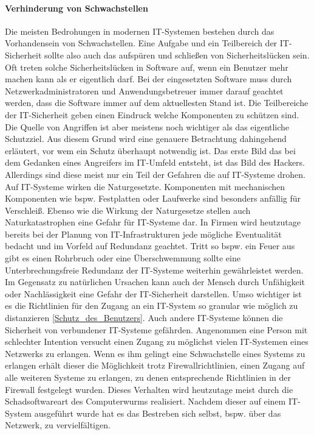 \documentclass[utf8,biblatex]{lni}
\begin{document}
\paragraph{Verhinderung von Schwachstellen}
Die meisten Bedrohungen in modernen IT-Systemen bestehen durch das Vorhandensein von Schwachstellen. Eine Aufgabe und ein Teilbereich der IT-Sicherheit sollte also auch 
das aufspüren und schließen von Sicherheitslücken sein. Oft treten solche Sicherheitslücken in Software auf, wenn ein Benutzer mehr machen kann als er eigentlich darf. 
Bei der eingesetzten Software muss durch Netzwerkadministratoren und Anwendungsbetreuer immer darauf geachtet werden, dass die Software immer auf dem aktuellesten Stand ist. 
\newline
Die Teilbereiche der IT-Sicherheit geben einen Eindruck welche Komponenten zu schützen sind. 
Die Quelle von Angriffen ist aber meistens noch wichtiger als das eigentliche Schutzziel. Aus diesem Grund wird eine genauere Betrachtung dahingehend 
erläutert, vor wem ein Schutz überhaupt notwendig ist. 
\newline
Das erste Bild das bei dem Gedanken eines Angreifers im IT-Umfeld entsteht, ist das Bild des Hackers. Allerdings sind diese meist nur ein Teil der Gefahren die auf IT-Systeme drohen. 
Auf IT-Systeme wirken die Naturgesetzte. Komponenten mit mechanischen Komponenten wie bspw. Festplatten oder Laufwerke sind besonders anfällig für Verschleiß. 
Ebenso wie die Wirkung der Naturgesetze stellen auch Naturkatastrophen eine Gefahr für IT-Systeme dar. In Firmen wird heutzutage bereits bei der Planung von 
IT-Infrastrukturen jede mögliche Eventualität bedacht und im Vorfeld auf Redundanz geachtet. Tritt so bspw. ein Feuer aus gibt es einen Rohrbruch oder eine Überschwemmung sollte 
eine Unterbrechungsfreie Redundanz der IT-Systeme weiterhin gewährleistet werden. 
\newline
Im Gegensatz zu natürlichen Ursachen kann auch der Mensch durch Unfähigkeit oder Nachlässigkeit eine Gefahr der IT-Sicherheit darstellen. 
Umso wichtiger ist es die Richtlinien für den Zugang an ein IT-System so granular wie möglich zu distanzieren \autoref{Schutz_des_Benutzers}.
\newline 
Auch andere IT-Systeme können die Sicherheit von verbundener IT-Systeme gefährden. Angenommen eine Person mit schlechter Intention versucht einen Zugang zu möglichst vielen 
IT-Systemen eines Netzwerks zu erlangen. Wenn es ihm gelingt eine Schwachstelle eines Systems zu erlangen erhält dieser die Möglichkeit trotz Firewallrichtlinien, einen Zugang 
auf alle weiteren Systeme zu erlangen, zu denen entsprechende Richtlinien in der Firewall festgelegt wurden. Dieses Verhalten wird heutzutage meist durch die Schadsoftwareart des 
\glqq Computerwurms \grqq{} realisiert. Nachdem dieser auf einem IT-System ausgeführt wurde hat es das Bestreben sich selbst, bspw. über das Netzwerk, zu vervielfältigen.
\end{document}
